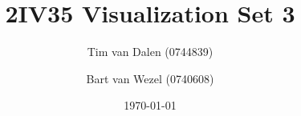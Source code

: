 \documentclass[a4paper,11pt]{article}
\title{
	2IV35 Visualization Set 3 \\
}
\author{
	Tim van Dalen (0744839)
	\and
	Bart van Wezel (0740608)
}
\date{\today}
\begin{document}
	\maketitle
	\newpage
	

	
	
	

	

	

	
	
	\newpage
	\begin{appendix}

	\end{appendix}
\end{document}
